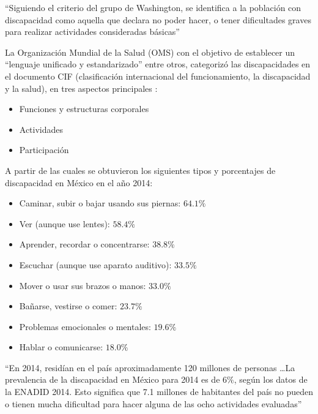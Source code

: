 
``Siguiendo el criterio del grupo de Washington, se identifica a la
 poblaci\'on con discapacidad como aquella que declara no poder hacer, 
 o tener dificultades graves para realizar actividades consideradas 
 b\'asicas''\cite{INEGI2014}


La Organizaci\'on Mundial de la Salud (OMS) con el objetivo de 
 establecer un ``lenguaje unificado y
 estandarizado''\cite{9241545429} entre otros, categoriz\'o las 
 discapacidades en el documento CIF (clasificaci\'on internacional 
 del funcionamiento, la discapacidad y la salud), en tres aspectos
 principales \cite{9241545429}:


\begin{itemize}
	\item Funciones y estructuras corporales
	\item Actividades
	\item Participaci\'on
\end{itemize}


A partir de las cuales se obtuvieron los siguientes tipos y porcentajes 
 de discapacidad en M\'exico en el a\~no 2014\cite{INEGI2014}:


\begin{itemize}
	\item {Caminar, subir o bajar usando sus piernas: $64.1\%$ }
	\item {Ver (aunque use lentes): $58.4\%$ }
  	\item {Aprender, recordar o concentrarse: $38.8\%$ } 
	\item {Escuchar (aunque use aparato auditivo): $33.5\%$ } 
	\item {Mover o usar sus brazos o manos: $33.0\%$ }
 	\item {Ba\~narse, vestirse o comer: $23.7\%$ }
	\item {Problemas emocionales o mentales: $19.6\%$ }
	\item {Hablar o comunicarse: $18.0\%$ }
\end{itemize}


``En 2014, resid\'ian en el pa\'is aproximadamente 120 millones de personas
 \ldots La prevalencia de la discapacidad en M\'exico para 2014 es de $6\%$, 
 seg\'un los datos de la ENADID 2014. Esto significa que 7.1 millones de 
 habitantes del pa\'is no pueden o tienen mucha dificultad para hacer 
 alguna de las ocho actividades evaluadas''\cite{INEGI2014}



